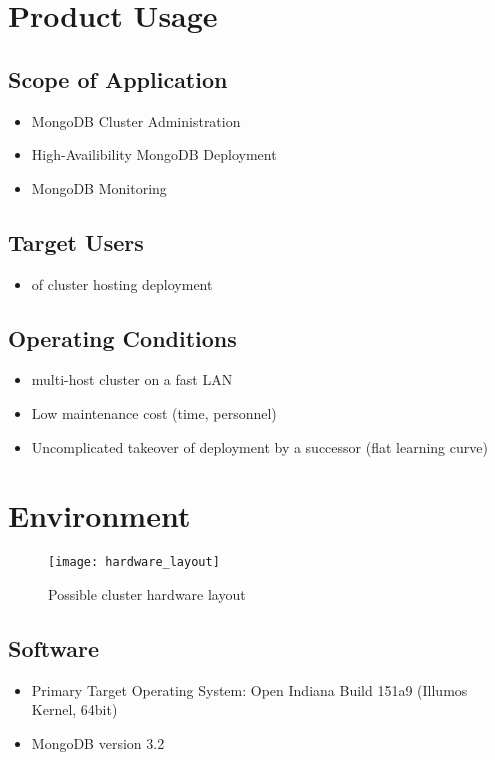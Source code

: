 \documentclass[a4paper, 11pt]{article}
\begin{document}
\section{Product Usage}

\subsection{Scope of Application}
\begin{itemize}
\item MongoDB Cluster Administration
\item High-Availibility \gls{MongoDB} Deployment
\item \gls{MongoDB} Monitoring
\end{itemize}

\subsection{Target Users}
\begin{itemize}
\item {} of \gls{cluster} hosting \mamid deployment
\end{itemize}

\subsection{Operating Conditions}
\begin{itemize}
\item multi-\gls{host} \gls{cluster} on a fast \acrshort{LAN}
\item Low maintenance cost (time, personnel)
\item Uncomplicated takeover of deployment by a successor (flat learning curve)
\end{itemize}

\section{Environment}

\begin{figure}[H]
	\centering
	\texttt{[image: hardware\_layout]}
	\caption{Possible cluster hardware layout}
\end{figure}

\subsection{Software}\label{subsec:Software}
\begin{itemize}
\item Primary Target Operating System: Open Indiana Build 151a9 (Illumos Kernel, 64bit)
\item MongoDB version 3.2
\end{itemize}
\end{document}
